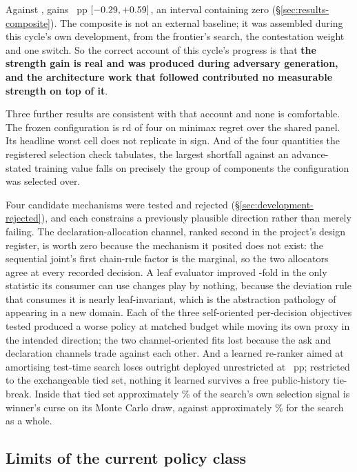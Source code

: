 Against \composite{}, \sestina{} gains \vsevenBtwoComposite{}~pp
$[-0.29, +0.59]$, an interval containing zero
(\S\ref{sec:results-composite}). The composite is not an external baseline; it was assembled during
this cycle's own development, from the \vsix{} frontier's search, the contestation weight and one
switch. So the correct account of this cycle's progress is that \textbf{the strength gain is real and
was produced during adversary generation, and the architecture work that followed contributed no
measurable strength on top of it}.

Three further results are consistent with that account and none is comfortable. The frozen
configuration is \vsevenRegretFrozenRank{}rd of four on minimax regret over the shared panel. Its
headline worst cell does not replicate in sign. And of the four quantities the registered selection
check tabulates, the largest shortfall against an advance-stated training value falls on precisely
the group of components the configuration was selected over.

Four candidate mechanisms were tested and rejected (\S\ref{sec:development-rejected}), and each
constrains a previously plausible direction rather than merely failing. The declaration-allocation
channel, ranked second in the project's design register, is worth zero because the mechanism it
posited does not exist: the sequential joint's first chain-rule factor is the marginal, so the two
allocators agree at every recorded decision. A leaf evaluator improved \vsevenKoneFold{}-fold in the
only statistic its consumer can use changes play by nothing, because the deviation rule that consumes
it is nearly leaf-invariant, which is the abstraction pathology of \cite{waugh-abstraction} appearing
in a new domain. Each of the three self-oriented per-decision objectives tested produced a worse policy at matched
budget while moving its own proxy in the intended direction; the two channel-oriented fits lost
because the ask and declaration channels trade against each other. And a learned re-ranker aimed at amortising test-time search loses outright deployed unrestricted
at \vsevenKfiveUnrestricted{}~pp; restricted to the exchangeable tied set, nothing it learned
survives a free public-history tie-break. Inside that tied set approximately \vsevenCurseTieShare\% of the
search's own selection signal is winner's curse on its Monte Carlo draw, against approximately
\vsevenCurseShare\% for the search as a whole.

\subsection{Limits of the current policy class}
\label{sec:discussion-limits}

